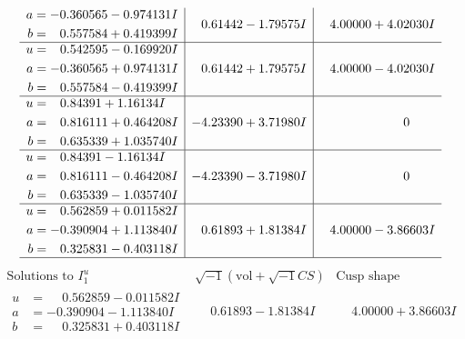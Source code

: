 \documentclass[1p]{elsarticle_modified}
\theoremstyle{definition}
\newcommand{\I}{\sqrt{-1}}
\begin{document}
$$\begin{array}{c|c|c}
\begin{aligned}
a &= -0.360565 - 0.974131 I \\
b &= \phantom{-}0.557584 + 0.419399 I\end{aligned}
 & \phantom{-}0.61442 - 1.79575 I & \phantom{-}4.00000 + 4.02030 I \\ \hline\begin{aligned}
u &= \phantom{-}0.542595 - 0.169920 I \\
a &= -0.360565 + 0.974131 I \\
b &= \phantom{-}0.557584 - 0.419399 I\end{aligned}
 & \phantom{-}0.61442 + 1.79575 I & \phantom{-}4.00000 - 4.02030 I \\ \hline\begin{aligned}
u &= \phantom{-}0.84391 + 1.16134 I \\
a &= \phantom{-}0.816111 + 0.464208 I \\
b &= \phantom{-}0.635339 + 1.035740 I\end{aligned}
 & -4.23390 + 3.71980 I & \phantom{-0.000000 } 0 \\ \hline\begin{aligned}
u &= \phantom{-}0.84391 - 1.16134 I \\
a &= \phantom{-}0.816111 - 0.464208 I \\
b &= \phantom{-}0.635339 - 1.035740 I\end{aligned}
 & -4.23390 - 3.71980 I & \phantom{-0.000000 } 0 \\ \hline\begin{aligned}
u &= \phantom{-}0.562859 + 0.011582 I \\
a &= -0.390904 + 1.113840 I \\
b &= \phantom{-}0.325831 - 0.403118 I\end{aligned}
 & \phantom{-}0.61893 + 1.81384 I & \phantom{-}4.00000 - 3.86603 I\\
 \hline 
 \end{array}$$\newpage$$\begin{array}{c|c|c}  
\text{Solutions to }I^u_{1}& \I (\text{vol} + \sqrt{-1}CS) & \text{Cusp shape}\\
 \hline 
\begin{aligned}
u &= \phantom{-}0.562859 - 0.011582 I \\
a &= -0.390904 - 1.113840 I \\
b &= \phantom{-}0.325831 + 0.403118 I\end{aligned}
 & \phantom{-}0.61893 - 1.81384 I & \phantom{-}4.00000 + 3.86603 I \\ \hline\begin{aligned}

\end{aligned}
\end{array}$$
\end{document}
